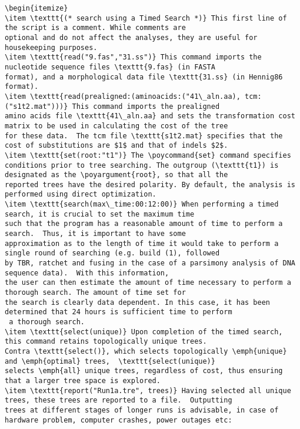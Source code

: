 \begin{verbatim}
\begin{itemize}
\item \texttt{(* search using a Timed Search *)} This first line of the script is a comment. While comments are 
optional and do not affect the analyses, they are useful for housekeeping purposes.
\item \texttt{read("9.fas","31.ss")} This command imports the nucleotide sequence files \texttt{9.fas} (in FASTA 
format), and a morphological data file \texttt{31.ss} (in Hennig86 format).
\item \texttt{read(prealigned:(aminoacids:("41\_aln.aa), tcm:("s1t2.mat")))} This command imports the prealigned
amino acids file \texttt{41\_aln.aa} and sets the transformation cost matrix to be used in calculating the cost of the tree
for these data.  The tcm file \texttt{s1t2.mat} specifies that the cost of substitutions are $1$ and that of indels $2$.
\item \texttt{set(root:"t1")} The \poycommand{set} command specifies 
conditions prior to tree searching. The outgroup (\texttt{t1}) is designated as the \poyargument{root}, so that all the 
reported trees have the desired polarity. By default, the analysis is performed using direct optimization.
\item \texttt{search(max\_time:00:12:00)} When performing a timed search, it is crucial to set the maximum time 
such that the program has a reasonable amount of time to perform a search.  Thus, it is important to have some 
approximation as to the length of time it would take to perform a single round of searching (e.g. build (1), followed 
by TBR, ratchet and fusing in the case of a parsimony analysis of DNA sequence data).  With this information, 
the user can then estimate the amount of time necessary to perform a thorough search. The amount of time set for 
the search is clearly data dependent. In this case, it has been determined that 24 hours is sufficient time to perform 
 a thorough search.
\item \texttt{select(unique)} Upon completion of the timed search, this command retains topologically unique trees.
Contra \texttt{select()}, which selects topologically \emph{unique} and \emph{optimal} trees,  \texttt{select(unique)} 
selects \emph{all} unique trees, regardless of cost, thus ensuring that a larger tree space is explored.
\item \texttt{report("Run1a.tre", trees)} Having selected all unique trees, these trees are reported to a file.  Outputting
trees at different stages of longer runs is advisable, in case of hardware problem, computer crashes, power outages etc: 

\end{verbatim}
